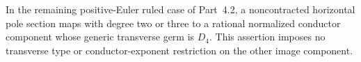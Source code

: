 
\begin{proposition}[P4R.18]\hypertarget{tag-02YB}{}\label{night:P4R.18}\label{stmt:P4R.18}


In the remaining positive-Euler ruled case of Part~4.2, a
noncontracted horizontal pole section maps with degree two or
three to a rational normalized conductor component whose generic
transverse germ is $D_4$. This assertion imposes no transverse
type or conductor-exponent restriction on the other image component.
\end{proposition}


